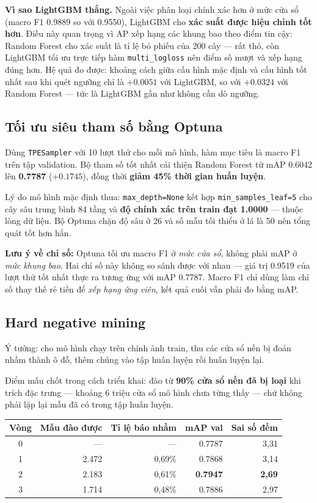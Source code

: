 \documentclass[12pt]{ai_conquer2026}
\begin{document}
\textbf{Vì sao LightGBM thắng.} Ngoài việc phân loại chính xác hơn ở mức cửa sổ (macro F1 0.9889 so với 0.9550), LightGBM cho \textbf{xác suất được hiệu chỉnh tốt hơn}. Điều này quan trọng vì AP xếp hạng các khung bao theo điểm tin cậy: Random Forest cho xác suất là tỉ lệ bỏ phiếu của 200 cây --- rất thô, còn LightGBM tối ưu trực tiếp hàm \texttt{multi\_logloss} nên điểm số mượt và xếp hạng đúng hơn. Hệ quả đo được: khoảng cách giữa cấu hình mặc định và cấu hình tốt nhất sau khi quét ngưỡng chỉ là $+0.0051$ với LightGBM, so với $+0.0324$ với Random Forest --- tức là LightGBM gần như không cần dò ngưỡng.

\subsection{Tối ưu siêu tham số bằng Optuna}

Dùng \texttt{TPESampler} với 10 lượt thử cho mỗi mô hình, hàm mục tiêu là macro F1 trên tập validation. Bộ tham số tốt nhất cải thiện Random Forest từ mAP 0.6042 lên \textbf{0.7787} ($+0.1745$), đồng thời \textbf{giảm 45\% thời gian huấn luyện}.

Lý do mô hình mặc định thua: \texttt{max\_depth=None} kết hợp \texttt{min\_samples\_leaf=5} cho cây sâu trung bình 84 tầng và \textbf{độ chính xác trên train đạt 1.0000} --- thuộc lòng dữ liệu. Bộ Optuna chặn độ sâu ở 26 và số mẫu tối thiểu ở lá là 50 nên tổng quát tốt hơn hẳn.

\textbf{Lưu ý về chỉ số:} Optuna tối ưu macro F1 ở \textit{mức cửa sổ}, không phải mAP ở \textit{mức khung bao}. Hai chỉ số này không so sánh được với nhau --- giá trị 0.9519 của lượt thử tốt nhất thực ra tương ứng với mAP 0.7787. Macro F1 chỉ dùng làm chỉ số thay thế rẻ tiền để \textit{xếp hạng ứng viên}, kết quả cuối vẫn phải đo bằng mAP.

\subsection{Hard negative mining}

Ý tưởng: cho mô hình chạy trên chính ảnh train, thu các cửa sổ nền bị đoán nhầm thành ô đỗ, thêm chúng vào tập huấn luyện rồi huấn luyện lại.

Điểm mấu chốt trong cách triển khai: đào từ \textbf{90\% cửa sổ nền đã bị loại} khi trích đặc trưng --- khoảng 6 triệu cửa sổ mô hình chưa từng thấy --- chứ không phải lặp lại mẫu đã có trong tập huấn luyện.

\begin{center}
\begin{tabular}{|c|r|r|r|r|}
\hline
\textbf{Vòng} & \textbf{Mẫu đào được} & \textbf{Tỉ lệ báo nhầm} & \textbf{mAP val} & \textbf{Sai số đếm} \\
\hline
0 & --- & --- & 0.7787 & 3,31 \\
1 & 2.472 & 0,69\% & 0.7868 & 3,14 \\
2 & 2.183 & 0,61\% & \textbf{0.7947} & \textbf{2,69} \\
3 & 1.714 & 0,48\% & 0.7886 & 2,97 \\
\hline
\end{tabular}
\end{center}
\end{document}
